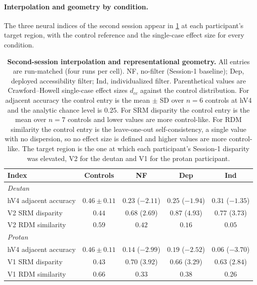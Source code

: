 \paragraph{Interpolation and geometry by condition.}
The three neural indices of the second session appear in \cref{tab:exp2_geometry} at each participant's target region, with the control reference and the single-case effect size for every condition.

\begin{table}[tb]
  \centering
  \caption{\textbf{Second-session interpolation and representational geometry.} All entries are run-matched (four runs per cell). NF, no-filter (Session-1 baseline); Dep, deployed accessibility filter; Ind, individualized filter. Parenthetical values are Crawford--Howell single-case effect sizes $d_{cc}$ against the control distribution. For adjacent accuracy the control entry is the mean $\pm$ SD over $n = 6$ controls at hV4 and the analytic chance level is $0.25$. For SRM disparity the control entry is the mean over $n = 7$ controls and lower values are more control-like. For RDM similarity the control entry is the leave-one-out self-consistency, a single value with no dispersion, so no effect size is defined and higher values are more control-like. The target region is the one at which each participant's Session-1 disparity was elevated, V2 for the deutan and V1 for the protan participant.}
  \label{tab:exp2_geometry}
  \small
  \begin{tabular}{lcccc}
    \toprule
    Index & Controls & NF & Dep & Ind \\
    \midrule
    \multicolumn{5}{l}{\emph{Deutan}} \\
    \quad hV4 adjacent accuracy & $0.46 \pm 0.11$ & $0.23$ ($-2.11$) & $0.25$ ($-1.94$) & $0.31$ ($-1.35$) \\
    \quad V2 SRM disparity & $0.44$ & $0.68$ ($2.69$) & $0.87$ ($4.93$) & $0.77$ ($3.73$) \\
    \quad V2 RDM similarity & $0.59$ & $0.42$ & $0.16$ & $0.05$ \\
    \midrule
    \multicolumn{5}{l}{\emph{Protan}} \\
    \quad hV4 adjacent accuracy & $0.46 \pm 0.11$ & $0.14$ ($-2.99$) & $0.19$ ($-2.52$) & $0.06$ ($-3.70$) \\
    \quad V1 SRM disparity & $0.43$ & $0.70$ ($3.92$) & $0.66$ ($3.29$) & $0.63$ ($2.84$) \\
    \quad V1 RDM similarity & $0.66$ & $0.33$ & $0.38$ & $0.26$ \\
    \bottomrule
  \end{tabular}
\end{table}

